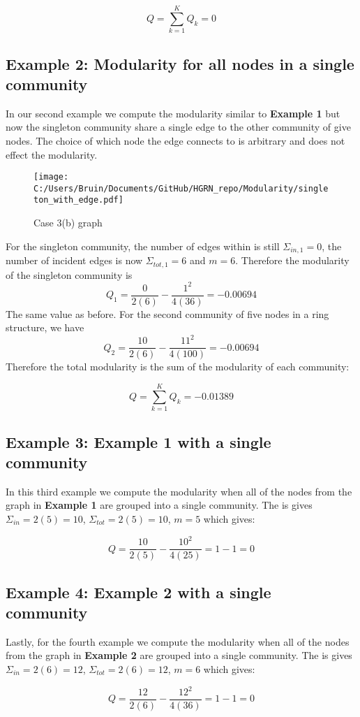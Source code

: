 \documentclass[a4paper,12pt]{article}
\begin{document}
	\[ Q = \sum_{k=1}^K Q_k = 0\]
	\subsection*{Example 2: Modularity for all nodes in a single community}
	In our second example we compute the modularity similar to \textbf{Example 1} but now the singleton community share a single edge to the other community of give nodes. The choice of which node the edge connects to is arbitrary and does not effect the modularity.  
	
	\begin{figure}[H]
		\centering
		\caption{Case 3(b) graph}
		\texttt{[image: C:/Users/Bruin/Documents/GitHub/HGRN\_repo/Modularity/singleton\_with\_edge.pdf]}
		\label{fig:case3b}
	\end{figure}
	
	For the singleton community, the number of edges within is still $\Sigma_{in,1} = 0$, the number of incident edges is now $\Sigma_{tot,1} = 6$ and $m = 6$. Therefore the modularity of the singleton community is 
	\[Q_1 = \frac{0}{2(6)} - \frac{1^2}{4(36)} = -0.00694\]
	The same value as before. For the second community of five nodes in a ring structure, we have 
	\[Q_2 = \frac{10}{2(6)} - \frac{11^2}{4(100)} = -0.00694\]
	Therefore the total modularity is the sum of the modularity of each community:
	
	\[ Q = \sum_{k=1}^K Q_k = -0.01389\]
	
	\subsection*{Example 3: Example 1 with a single community}
	In this third example we compute the modularity when all of the nodes from the graph in \textbf{Example 1} are grouped into a single community. The is gives $\Sigma_{in} = 2(5) = 10$, $\Sigma_{tot} = 2(5) = 10$,  $m = 5$ which gives:
	
	\[ Q = \frac{10}{2(5)}-\frac{10^2}{4(25)} = 1-1 = 0 \]
	\subsection*{Example 4: Example 2 with a single community}
	Lastly, for the fourth example we compute the modularity when all of the nodes from the graph in \textbf{Example 2} are grouped into a single community. The is gives $\Sigma_{in} = 2(6) = 12$, $\Sigma_{tot} = 2(6) = 12$,  $m = 6$ which gives:
	
	\[ Q = \frac{12}{2(6)}-\frac{12^2}{4(36)} = 1-1 = 0 \]
	
\end{document}
